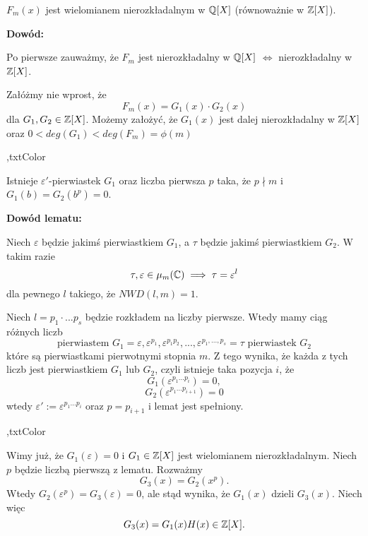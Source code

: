 \begin{remark} $F_m(x)$ jest wielomianem nierozkładalnym w $\mathbb{Q}[X]$ (równoważnie w $\mathbb{Z}[X]$).
\end{remark}

\textbf{Dowód:} 

Po pierwsze zauważmy, że $F_m$ jest nierozkładalny w $\mathbb{Q}[X]$ $\iff$ nierozkładalny w $\mathbb{Z}[X]$. 

Załóżmy nie wprost, że
$$F_m(x)=G_1(x)\cdot G_2(x)$$
dla $G_1,G_2\in\mathbb{Z}[X]$. Możemy założyć, że $G_1(x)$ jest dalej nierozkładalny w $\mathbb{Z}[X]$ oraz $0<deg(G_1)<deg(F_m)=\phi(m)$
\medskip

\sep{txtColor}
\medskip

 Istnieje $\varepsilon'$-pierwiastek $G_1$ oraz liczba pierwsza $p$ taka, że $p\nmid m$ i $G_1(b)=G_2(b^p)=0$.

\textbf{Dowód lematu:}

Niech $\varepsilon$ będzie jakimś pierwiastkiem $G_1$, a $\tau$ będzie jakimś pierwiastkiem $G_2$. W takim razie
$$\tau,\varepsilon\in\mu_m(\mathbb{C})\implies\tau=\varepsilon^l$$
dla pewnego $l$ takiego, że $NWD(l,m)=1$.


Niech $l=p_1\cdot...p_s$ będzie rozkładem na liczby pierwsze. Wtedy mamy ciąg różnych liczb
$$\text{pierwiastem }G_1=\varepsilon, \varepsilon^{p_1},\varepsilon^{p_1p_2},...,\varepsilon^{p_1,...,p_s}=\tau\text{ pierwiastek }G_2$$
które są pierwiastkami pierwotnymi stopnia $m$. Z tego wynika, że każda z tych liczb jest pierwiastkiem $G_1$ lub $G_2$, czyli istnieje taka pozycja $i$, że
$$G_1(\varepsilon^{p_1...p_i})=0,$$
$$G_2(\varepsilon^{p_1...p_{i+1}})=0$$
wtedy $\varepsilon':=\varepsilon^{p_1...p_i}$ oraz $p=p_{i+1}$ i lemat jest spełniony.
\medskip

\sep{txtColor}
\medskip

Wimy już, że $G_1(\varepsilon)=0$ i $G_1\in\mathbb{Z}[X]$ jest wielomianem nierozkładalnym. Niech $p$ będzie liczbą pierwszą z lematu. Rozważmy
$$G_3(x)=G_2(x^p).$$
Wtedy $G_2(\varepsilon^p)=G_3(\varepsilon)=0$, ale stąd wynika, że $G_1(x)$ dzieli $G_3(x)$. Niech więc 
$$G_3(x)=G_1(x)H(x)\in\mathbb{Z}[X].$$

